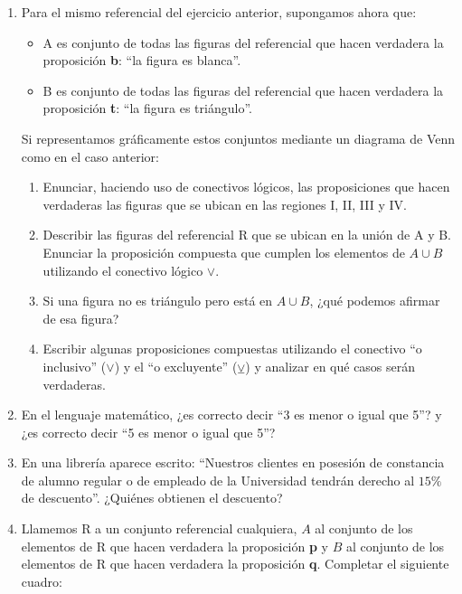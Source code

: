 \documentclass[12pt]{article}
\theoremstyle{definition}
\theoremstyle{remark}
\begin{document}
\begin{enumerate}
\item Para el mismo referencial del ejercicio anterior, supongamos ahora que:
\begin{itemize}
\setlength\itemsep{0em}
\item A es conjunto de todas las figuras del referencial que hacen verdadera la proposición \textbf{b}: “la figura es blanca”.
\item B es conjunto de todas las figuras del referencial que hacen verdadera la proposición \textbf{t}: “la figura es triángulo”. 
\end{itemize}
Si representamos gráficamente estos conjuntos mediante un diagrama de Venn como en el caso anterior:

\begin{enumerate}
\item Enunciar, haciendo uso de conectivos lógicos, las proposiciones que hacen verdaderas las figuras que se ubican en las regiones  I, II, III y IV.\\
\item Describir las figuras del referencial R que se ubican en la unión de A y B. Enunciar la proposición compuesta que cumplen los elementos de  $A\cup B$ utilizando el conectivo lógico  $\vee$.\\
\item Si una figura no es triángulo pero está en $A\cup B$, ¿qué podemos afirmar de esa figura?\\
\item Escribir algunas proposiciones compuestas utilizando el conectivo “o inclusivo” ($\vee$) y el “o excluyente” ($\veebar$) y analizar en qué casos serán verdaderas.\\
\end{enumerate}

\item En el lenguaje matemático, ¿es correcto decir “3 es menor o igual que 5”? y ¿es correcto decir  “5 es menor o igual que 5”?

\item En una librería aparece escrito: “Nuestros clientes en posesión de constancia de alumno regular o de empleado de la Universidad tendrán derecho al $15\%$ de descuento”. ¿Quiénes obtienen el descuento?

\item Llamemos R a un conjunto referencial cualquiera, $A$ al conjunto de los elementos de R que hacen verdadera la proposición \textbf{p} y $B$ al conjunto de los elementos de R que hacen verdadera la proposición \textbf{q}. Completar el siguiente cuadro:


\end{enumerate}
\end{document}
